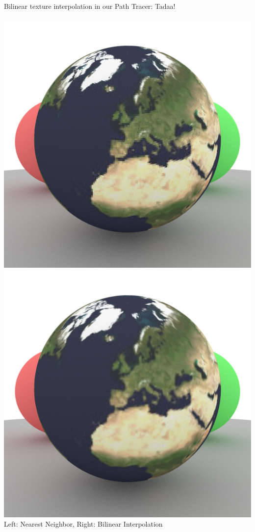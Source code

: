 \documentclass[utf8,stillsansserifmath,fleqn,t]{beamer}
\begin{document}
\begin{frame}
\frametitle{\insertsection}
Bilinear texture interpolation in our Path Tracer: Tadaa!\\~\\
\includegraphics[width=.48\textwidth]{./fig/pathtracer-result-12-1.png}\hfill
\includegraphics[width=.48\textwidth]{./fig/pathtracer-result-12-2.png}\\
Left: Nearest Neighbor, Right: Bilinear Interpolation
\end{frame}
\end{document}
